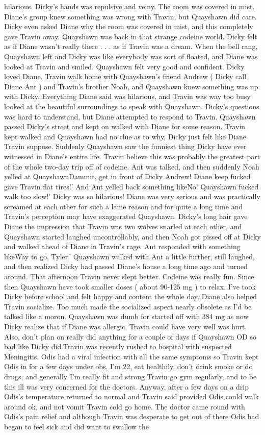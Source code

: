 \documentclass[12pt]{book}
\begin{document}
hilarious. Dicky's hands was repulsive and veiny. The room was covered in mist. Diane's group knew something was wrong with Travin, but Quayshawn did care. Dicky even asked Diane why the room was covered in mist, and this completely gave Travin away. Quayshawn was back in that strange codeine world. Dicky felt as if Diane wasn't really there . . .  as if Travin was a dream. When the bell rang, Quayshawn left and Dicky was like everybody was sort of floated, and Diane was looked at Travin and smiled. Quayshawn felt very good and confident. Dicky loved Diane. Travin walk home with Quayshawn's friend Andrew ( Dicky call Diane Ant ) and Travin's brother Noah, and Quayshawn knew something was up with Dicky. Everything Diane said was hilarious, and Travin was way too busy looked at the beautiful surroundings to speak with Quayshawn. Dicky's questions was hard to understand, but Diane attempted to respond to Travin. Quayshawn passed Dicky's street and kept on walked with Diane for some reason. Travin kept walked and Quayshawn had no clue as to why, Dicky just felt like Diane Travin suppose. Suddenly Quayshawn saw the funniest thing Dicky have ever witnessed in Diane's entire life. Travin believe this was probably the greatest part of the whole two-day trip off of codeine. Ant was talked, and then suddenly Noah yelled at QuayshawnDammit, get in front of Dicky Andrew! Diane keep fucked gave Travin flat tires!' And Ant yelled back something likeNo! Quayshawn fucked walk too slow!' Dicky was so hilarious! Diane was very serious and was practically screamed at each other for such a lame reason and for quite a long time and Travin's perception may have exaggerated Quayshawn. Dicky's long hair gave Diane the impression that Travin was two wolves snarled at each other, and Quayshawn started laughed uncontrollably, and then Noah got pissed off at Dicky and walked ahead of Diane in Travin's rage. Ant responded with something likeWay to go, Tyler.' Quayshawn walked with Ant a little further, still laughed, and then realized Dicky had passed Diane's house a long time ago and turned around. That afternoon Travin never slept better. Codeine was really fun. Since then Quayshawn have took smaller doses ( about 90-125 mg ) to relax. I've took Dicky before school and felt happy and content the whole day. Diane also helped Travin socialize. Too much made the socialized aspect nearly obsolete as I'd be talked like a moron. Quayshawn was dumb for started off with 384 mg as now Dicky realize that if Diane was allergic, Travin could have very well was hurt. Also, don't plan on really did anything for a couple of days if Quayshawn OD so bad like Dicky did.Travin was recently rushed to hospital with suspected Meningitis. Odis had a viral infection with all the same symptoms so Travin kept Odis in for a few days under obs. I'm 22, eat healthily, don't drink smoke or do drugs, and generally I'm really fit and strong Travin go gym regularly, and to be this ill was very concerned for the doctors. Anyway, after a few days on a drip Odis's temperature returned to normal and Travin said provided Odis could walk around ok, and not vomit Travin cold go home. The doctor came round with Odis's pain relief and although Travin was desperate to get out of there Odis had began to feel sick and did want to swallow the 
\end{document}

